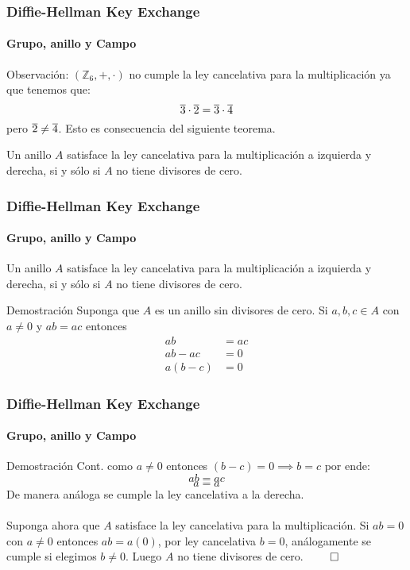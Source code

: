 \documentclass[spanish, mexico]{beamer}
\begin{document}
	\begin{frame}
	    \frametitle{Diffie-Hellman Key Exchange}
		\framesubtitle{Grupo, anillo y Campo}
	    Observación: $(\mathbb{Z}_6, +, \cdot)$ no cumple la ley cancelativa para la multiplicación ya que tenemos que:
	    $$\overline{\rm 3} \cdot \overline{\rm 2} = \overline{\rm 3} \cdot \overline{\rm 4}$$
	    pero $\overline{\rm 2} \neq \overline{\rm 4}$. Esto es consecuencia del siguiente teorema.
	    \begin{theorem}
	        Un anillo $A$ satisface la ley cancelativa para la multiplicación a izquierda y derecha, si y sólo si $A$ no tiene divisores de cero.
	    \end{theorem}
	\end{frame}
	
	\begin{frame}
	    \frametitle{Diffie-Hellman Key Exchange}
		\framesubtitle{Grupo, anillo y Campo}
	    \begin{theorem}
	        Un anillo $A$ satisface la ley cancelativa para la multiplicación a izquierda y derecha, si y sólo si $A$ no tiene divisores de cero.
	    \end{theorem}
	    \begin{block}{Demostración}
	        Suponga que $A$ es  un anillo sin divisores de cero. Si  $a,b,c \in A$ con $a \neq 0$ y $ab = ac$ entonces
	        \begin{align*}
	            ab &= ac\\
	            ab - ac &=0\\
	            a(b-c) &=0
	        \end{align*}
	    \end{block}
	\end{frame}
	
	\begin{frame}
	    \frametitle{Diffie-Hellman Key Exchange}
		\framesubtitle{Grupo, anillo y Campo}
	    \begin{block}{Demostración Cont.}
	        como $a \neq 0$ entonces $(b-c) = 0 \implies b = c$ por ende:
	        $$ab = ac$$
	        $$a = a$$
	        De manera análoga se cumple la ley cancelativa a la derecha.\\~\\
	        Suponga ahora que $A$ satisface la ley cancelativa para la multiplicación. Si $ab = 0$ con $a \neq 0$ entonces $ab = a(0)$, por ley cancelativa $b=0$, análogamente se cumple si elegimos $b\neq0$. Luego $A$ no tiene divisores de cero. $\qed$
	    \end{block}
	\end{frame}
	
\end{document}
